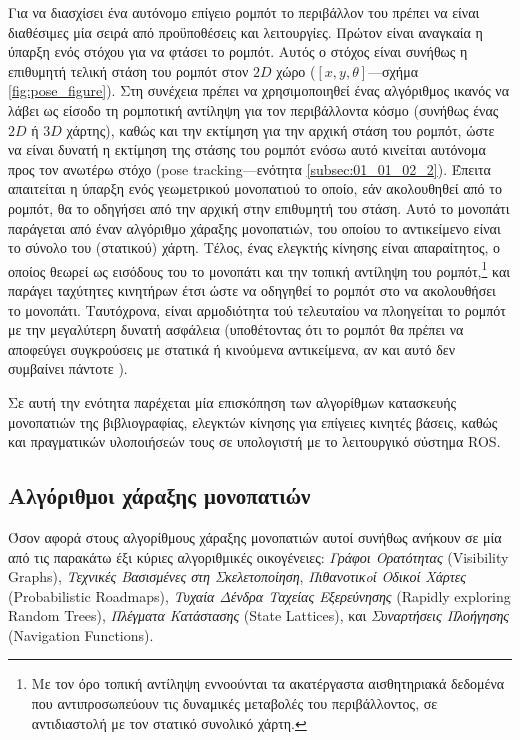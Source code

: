 Για να διασχίσει ένα αυτόνομο επίγειο ρομπότ το περιβάλλον του πρέπει να είναι
διαθέσιμες μία σειρά από προϋποθέσεις και λειτουργίες. Πρώτον είναι αναγκαία η
ύπαρξη ενός στόχου για να φτάσει το ρομπότ. Αυτός ο στόχος είναι συνήθως η
επιθυμητή τελική στάση του ρομπότ στον $2D$ χώρο ($[x, y, \theta]$---σχήμα
\ref{fig:pose_figure}). Στη συνέχεια πρέπει να χρησιμοποιηθεί ένας αλγόριθμος
ικανός να λάβει ως είσοδο τη ρομποτική αντίληψη για τον περιβάλλοντα κόσμο
(συνήθως ένας $2D$ ή $3D$ χάρτης), καθώς και την εκτίμηση για την αρχική στάση
του ρομπότ, ώστε να είναι δυνατή η εκτίμηση της στάσης του ρομπότ ενόσω αυτό
κινείται αυτόνομα προς τον ανωτέρω στόχο (pose tracking---ενότητα
\ref{subsec:01_01_02_2}).  Έπειτα απαιτείται η ύπαρξη ενός γεωμετρικού
μονοπατιού το οποίο, εάν ακολουθηθεί από το ρομπότ, θα το οδηγήσει από την
αρχική στην επιθυμητή του στάση. Αυτό το μονοπάτι παράγεται από έναν αλγόριθμο
χάραξης μονοπατιών, του οποίου το αντικείμενο είναι το σύνολο του (στατικού)
χάρτη. Τέλος, ένας ελεγκτής κίνησης είναι απαραίτητος, ο οποίος θεωρεί ως
εισόδους του το μονοπάτι και την τοπική αντίληψη του ρομπότ,\footnote{Με τον
όρο τοπική αντίληψη εννοούνται τα ακατέργαστα αισθητηριακά δεδομένα που
αντιπροσωπεύουν τις δυναμικές μεταβολές του περιβάλλοντος, σε αντιδιαστολή με
τον στατικό συνολικό χάρτη.} και παράγει ταχύτητες κινητήρων έτσι ώστε να
οδηγηθεί το ρομπότ στο να ακολουθήσει το μονοπάτι. Ταυτόχρονα, είναι
αρμοδιότητα τού τελευταίου να πλοηγείται το ρομπότ με την μεγαλύτερη δυνατή
ασφάλεια (υποθέτοντας ότι το ρομπότ θα πρέπει να αποφεύγει συγκρούσεις με
στατικά ή κινούμενα αντικείμενα, αν και αυτό δεν συμβαίνει πάντοτε
\cite{Gandhi2017}).

Σε αυτή την ενότητα παρέχεται μία επισκόπηση των αλγορίθμων κατασκευής
μονοπατιών της βιβλιογραφίας, ελεγκτών κίνησης για επίγειες κινητές βάσεις,
καθώς και πραγματικών υλοποιήσεών τους σε υπολογιστή με το λειτουργικό σύστημα
ROS.

\subsection{Αλγόριθμοι χάραξης μονοπατιών}
\label{subsection:02_01_02:01}

Όσον αφορά στους αλγορίθμους χάραξης μονοπατιών αυτοί συνήθως ανήκουν σε
μία από τις παρακάτω έξι κύριες αλγοριθμικές οικογένειες: \textit{Γράφοι
Ορατότητας} (Visibility Graphs), \textit{Τεχνικές Βασισμένες στη
Σκελετοποίηση}, \textit{Πιθανοτικoί Οδικοί Χάρτες} (Probabilistic Roadmaps),
\textit{Τυχαία Δένδρα Ταχείας Εξερεύνησης} (Rapidly exploring Random Trees),
\textit{Πλέγματα Κατάστασης} (State Lattices), και \textit{Συναρτήσεις
Πλοήγησης} (Navigation Functions).

